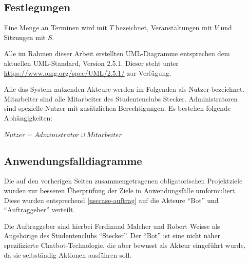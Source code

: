 \subsection{Festlegungen}

Eine Menge an Terminen wird mit $T$ bezeichnet, Veranstaltungen mit $V$ und Sitzungen mit $S$.

Alle im Rahmen dieser Arbeit erstellten UML-Diagramme entsprechen dem aktuellen UML-Standard, Version 2.5.1. Dieser steht unter \url{https://www.omg.org/spec/UML/2.5.1/} zur Verfügung.

Alle das System nutzenden Akteure werden im Folgenden als Nutzer bezeichnet. Mitarbeiter sind alle Mitarbeiter des Studentenclubs Stecker. Administratoren sind spezielle Nutzer mit zusätzlichen Berechtigungen.
Es bestehen folgende Abhängigkeiten: 

$Nutzer = Administrator \cup Mitarbeiter$ 

\subsection{Anwendungsfalldiagramme}


Die auf den vorherigen Seiten zusammengetragenen obligatorischen Projektziele wurden zur besseren Überprüfung der Ziele in Anwendungsfälle umformuliert. Diese wurden entsprechend \autoref{usecase-auftrag} auf die Akteure \enquote{Bot} und \enquote{Auftraggeber} verteilt.

Die Auftraggeber sind hierbei Ferdinand Malcher und Robert Weisse als Angehörige des Studentenclubs \enquote{Stecker}. Der \enquote{Bot} ist eine nicht näher spezifizierte Chatbot-Technologie, die aber bewusst als Akteur eingeführt wurde, da sie selbständig Aktionen ausführen soll.

